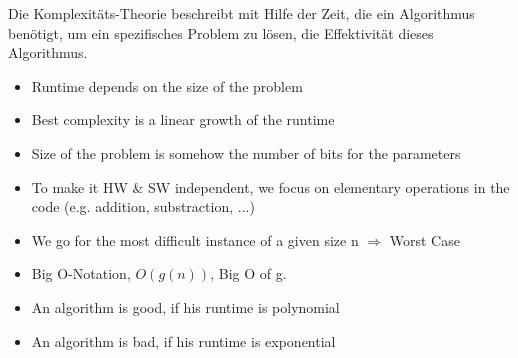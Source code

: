 Die Komplexitäts-Theorie beschreibt mit Hilfe der Zeit, die ein Algorithmus benötigt, um ein spezifisches Problem zu lösen, die Effektivität dieses Algorithmus.

\begin{itemize}
    \item Runtime depends on the size of the problem
    \item Best complexity is a linear growth of the runtime
    \item Size of the problem is somehow the number of bits for the parameters
    \item To make it HW \& SW independent, we focus on elementary operations in the code (e.g. addition, substraction, ...)
    \item We go for the most difficult instance of a given size n $\Rightarrow$ Worst Case
    \item Big O-Notation, $O(g(n))$, Big O of g.
    \item An algorithm is good, if his runtime is polynomial
    \item An algorithm is bad, if his runtime is exponential
\end{itemize}

\clearpage